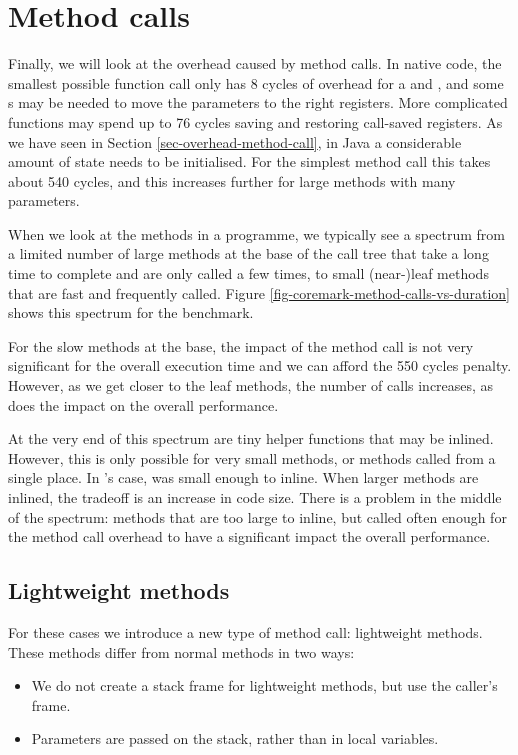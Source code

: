 \section{Method calls}
\label{sec-optimisations-method-calls}

Finally, we will look at the overhead caused by method calls. In native code, the smallest possible function call only has 8 cycles of overhead for a  and , and some s may be needed to move the parameters to the right registers. More complicated functions may spend up to 76 cycles saving and restoring call-saved registers. As we have seen in Section \ref{sec-overhead-method-call}, in Java a considerable amount of state needs to be initialised. For the simplest method call this takes about 540 cycles, and this increases further for large methods with many parameters.

When we look at the methods in a programme, we typically see a spectrum from a limited number of large methods at the base of the call tree that take a long time to complete and are only called a few times, to small (near-)leaf methods that are fast and frequently called. Figure \ref{fig-coremark-method-calls-vs-duration} shows this spectrum for the  benchmark.

For the slow methods at the base, the impact of the method call is not very significant for the overall execution time and we can afford the 550 cycles penalty. However, as we get closer to the leaf methods, the number of calls increases, as does the impact on the overall performance.

At the very end of this spectrum are tiny helper functions that may be inlined. However, this is only possible for very small methods, or methods called from a single place. In 's case,  was small enough to inline. When larger methods are inlined, the tradeoff is an increase in code size. There is a problem in the middle of the spectrum: methods that are too large to inline, but called often enough for the method call overhead to have a significant impact the overall performance.

\subsection{Lightweight methods}
For these cases we introduce a new type of method call: lightweight methods. These methods differ from normal methods in two ways:
\begin{itemize}
	\item We do not create a stack frame for lightweight methods, but use the caller's frame.
	\item Parameters are passed on the stack, rather than in local variables.
\end{itemize}

